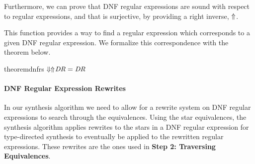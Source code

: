 \documentclass[numbers,10pt,preprint\ifanon ,nocopyrightspace\fi]{sigplanconf}
\begin{document}
Furthermore, we can prove that DNF regular expressions are sound with respect to
regular expressions,
and that \ToDNFRegex{} is surjective, by providing a right inverse, $\Uparrow$.\\

This function provides a way to find a regular expression which corresponds to a given
DNF regular expression.  We formalize this correspondence with the theorem
below.

\begin{restatable}{theorem}{dnfrs}
  \label{thm:dnfrs}
  $\Downarrow\mkern-4mu \,\Uparrow\mkern-4mu \mathit{DR} = \mathit{DR}$
\end{restatable}

\paragraph*{DNF Regular Expression Rewrites}

In our synthesis algorithm we need to allow for a rewrite system on DNF regular
expressions to search through the equivalences.
Using the star equivalences, the synthesis algorithm applies rewrites
to the stars in a DNF
regular expression for type-directed synthesis to eventually be applied to the
rewritten regular expressions.  These rewrites are the ones used in
\textbf{Step 2: Traversing Equivalences}.
\end{document}
